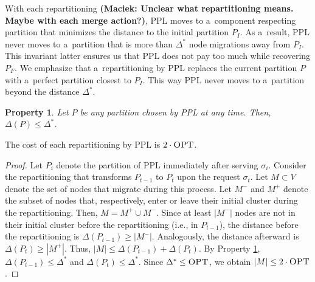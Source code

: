 \documentclass[a4paper,anonymous,USenglish]{lipics-v2019}
\newcommand{\OPT}{\textsc{OPT}\xspace}
\newcommand{\PPL}{\textsc{PPL}\xspace}
\newtheorem{property}{Property}
\newcommand\maciek[1]{\color{brown}\textbf{(Maciek: #1)}\color{black}}
\begin{document}
With each repartitioning \maciek{Unclear what repartitioning means. Maybe with each merge action?},
\PPL moves to a~component respecting partition that minimizes the distance to the initial partition $P_I$.
As a~result,
\PPL never moves to a~partition that is more than $\Delta^*$  node migrations away from $P_I$.
This invariant latter ensures us that \PPL does not pay too much while recovering $P_F$.
We emphasize that a~repartitioning by \PPL replaces the current partition $P$ with a~perfect partition closest to $P_I$.
This way \PPL never moves to a~partition beyond the distance $\Delta^*$.

\begin{property} \label{prop:dist<OPT}
	Let $P$ be any partition chosen by \PPL at any time.
	Then, $\Delta(P) \leq \Delta^*$.	
\end{property}

\begin{lemma}	\label{lemma:rebalancecost}
	The cost of each repartitioning by \PPL is $2\cdot\OPT$.
\end{lemma}
\begin{proof}
	Let $P_i$ denote the partition of \PPL immediately after serving $\sigma_{i}$.
	Consider the repartitioning that transforms 
	$P_{t-1}$ to $P_t$ upon the request $\sigma_t$.
	Let $M \subset V$ denote the set of nodes that migrate during this process.
	Let $M^-$ and $M^+$ denote the subset of nodes that, respectively,
	enter or leave their initial cluster during the repartitioning.    
	Then,
	$M = M^+ \cup M^-$.
	Since at least $|M^-|$ nodes are not in their initial cluster before the repartitioning (i.e., in $P_{t-1}$),
	the distance before the repartitioning is $\Delta(P_{t-1}) \geq | M^-|$.
	Analogously,
	the distance afterward is $\Delta(P_{t}) \geq | M^+|$.
	Thus,
	$|M| \leq \Delta(P_{t-1}) + \Delta(P_{t})$.
	By Property \ref{prop:dist<OPT},
	$\Delta(P_{t-1})  \leq \Delta^*$ and
	$\Delta(P_{t}) \leq \Delta^*$.
	Since $\Delta^* \leq \OPT$,
	we obtain	 $|M| \leq 2\cdot\OPT$.
\end{proof}
\end{document}

